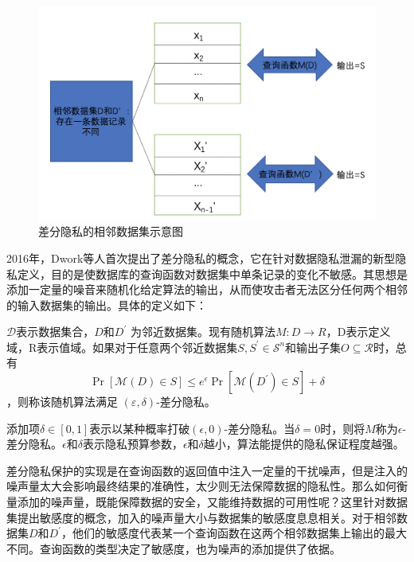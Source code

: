 \begin{figure}[!hbt]
\centering
	\includegraphics[scale=0.6]{fig2/C2/相邻数据集示意图}%
	\caption{差分隐私的相邻数据集示意图}
	\label{fig:相邻数据集示意图}	
\end{figure}

2016年，Dwork等人首次提出了差分隐私的概念，它在针对数据隐私泄漏的新型隐私定义，目的是使数据库的查询函数对数据集中单条记录的变化不敏感。其思想是添加一定量的噪音来随机化给定算法的输出，从而使攻击者无法区分任何两个相邻的输入数据集的输出。具体的定义如下：
\begin{define}[(ε,δ)-差分隐私]\label{(ε,δ)-差分隐私}
$\mathcal{D}$表示数据集合，$D$和$D^{\prime}$ 为邻近数据集。现有随机算法$M: D \rightarrow R$，D表示定义域，R表示值域。如果对于任意两个邻近数据集$S, S^{\prime} \in \mathcal{S}^{n}$和输出子集$O \subseteq \mathcal{R}$时，总有$$
\operatorname{Pr}[\mathcal{M}(D) \in S] \leq e^{\epsilon} \operatorname{Pr}\left[\mathcal{M}\left(D^{\prime}\right) \in S\right]+\delta
$$，则称该随机算法满足 $(\varepsilon, \delta)$-差分隐私。
\end{define}
添加项$\delta \in[0,1]$表示以某种概率打破$(\epsilon, 0)$-差分隐私。当$\delta=0$时，则将$M$称为$\epsilon$-差分隐私。$\epsilon$和$\delta$表示隐私预算参数，$\epsilon$和$\delta$越小，算法能提供的隐私保证程度越强。

差分隐私保护的实现是在查询函数的返回值中注入一定量的干扰噪声，但是注入的噪声量太大会影响最终结果的准确性，太少则无法保障数据的隐私性。那么如何衡量添加的噪声量，既能保障数据的安全，又能维持数据的可用性呢？这里针对数据集提出敏感度的概念，加入的噪声量大小与数据集的敏感度息息相关。对于相邻数据集$D$和$D^{\prime}$，他们的敏感度代表某一个查询函数在这两个相邻数据集上输出的最大不同。查询函数的类型决定了敏感度，也为噪声的添加提供了依据。

